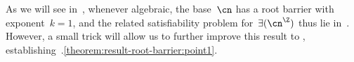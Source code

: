 \noindent
As we will see in~, whenever algebraic, the base~$\cn$ has a root barrier with exponent~${k =
1}$, and the related satisfiability problem for~$\exists(\ipow{\cn})$ thus lie in~\twoexptime.
However, a small trick will allow us to further improve this result to
\expspace,
establishing~.\ref{theorem:result-root-barrier:point1}. 










